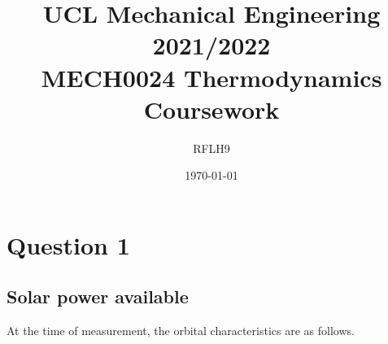 \documentclass[11pt]{article}
\numberwithin{equation}{section}
\begin{document}
\title{\textbf{UCL Mechanical Engineering 2021/2022}\\MECH0024 Thermodynamics Coursework}
\author{RFLH9}
\date{\today}
\maketitle
\tableofcontents
\listoffigures
\listoftables
\newpage
\section{Question 1}
\subsection{Solar power available}
At the time of measurement, the orbital characteristics are as follows.
\end{document}
